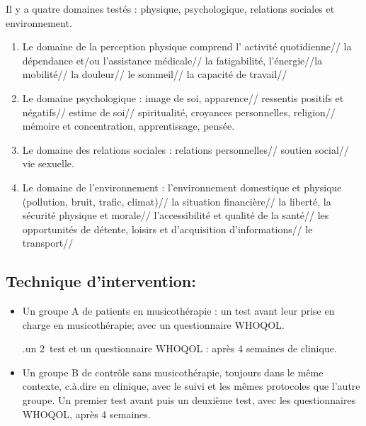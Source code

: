 Il y a quatre domaines testés : physique, psychologique, relations sociales et environnement.
\begin{enumerate}
	\item  Le domaine de la perception physique comprend l' activité quotidienne// la dépendance et/ou l'assistance médicale// la fatigabilité, l'énergie//la mobilité// la douleur// le sommeil// la capacité de travail//
	
		 \item Le domaine psychologique :  image de soi, apparence// ressentis positifs et négatifs// estime de soi// spiritualité, croyances personnelles, religion// mémoire et concentration, apprentissage, pensée.
		
			\item Le domaine des relations sociales : relations personnelles// soutien social// vie sexuelle.
			
			\item Le domaine de l'environnement : l'environnement domestique et  physique (pollution, bruit, trafic, climat)// la situation financière//  la liberté, la sécurité physique et morale// l'accessibilité et qualité de la santé// les opportunités de détente, loisirs et d'acquisition d'informations// le transport// 
		\end{enumerate}
		
	




        	
        \subsection{Technique d'intervention:}


       
\begin{itemize}
	\item Un groupe A de patients en musicothérapie : un
          test avant leur prise en charge en musicothérapie; avec un questionnaire
          WHOQOL.
          
          .un 2\ieme\ test et un questionnaire WHOQOL : après 4 semaines de
          clinique.
          
	\item Un groupe B de contrôle sans musicothérapie,
	toujours dans le même contexte, c.à.dire en clinique, avec le suivi et les mêmes protocoles que l'autre groupe. Un premier test avant
 puis un deuxième test, avec les questionnaires WHOQOL, après 4 semaines. 
\end{itemize}

